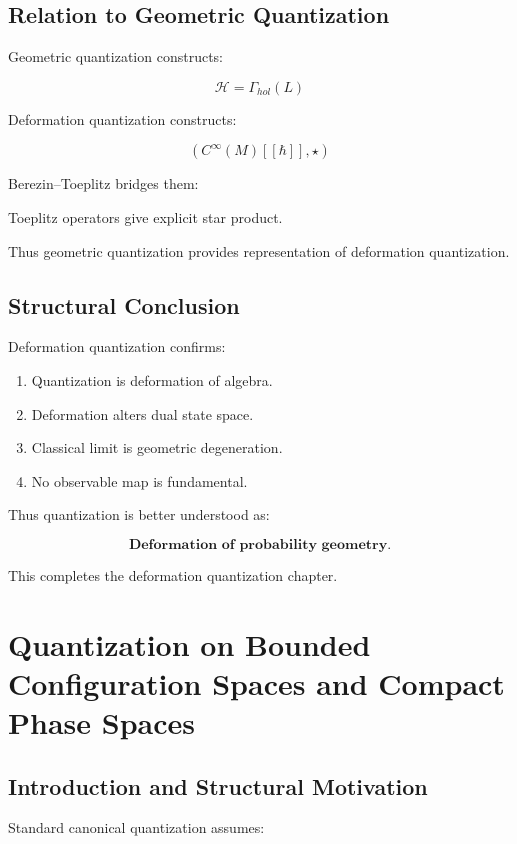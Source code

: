 \documentclass[11pt]{book}
\begin{document}
\section{Relation to Geometric Quantization}

Geometric quantization constructs:

\[
\mathcal{H}
=
\Gamma_{hol}(L)
\]

Deformation quantization constructs:

\[
(C^\infty(M)[[\hbar]],\star)
\]

Berezin--Toeplitz bridges them:

Toeplitz operators give explicit star product.

Thus geometric quantization provides representation
of deformation quantization.

\section{Structural Conclusion}

Deformation quantization confirms:

\begin{enumerate}
\item Quantization is deformation of algebra.
\item Deformation alters dual state space.
\item Classical limit is geometric degeneration.
\item No observable map is fundamental.
\end{enumerate}

Thus quantization is better understood as:

\[
\textbf{Deformation of probability geometry.}
\]

\bigskip

This completes the deformation quantization chapter.%
\chapter{Quantization on Bounded Configuration Spaces and Compact Phase Spaces}

\section{Introduction and Structural Motivation}

Standard canonical quantization assumes:
\end{document}
